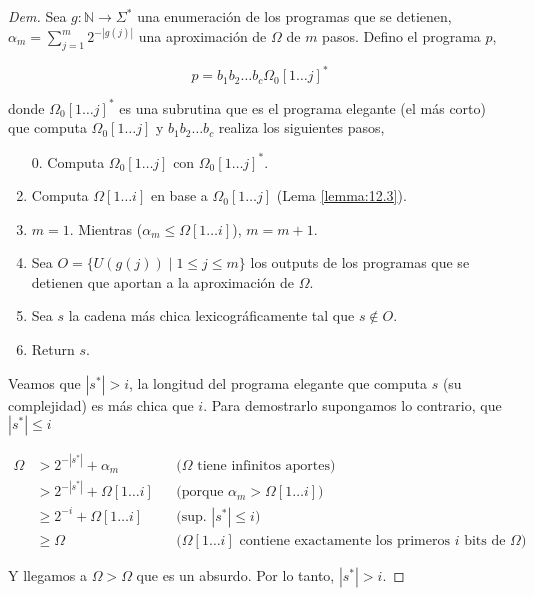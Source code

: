 \documentclass{article}
\theoremstyle{definition} %
\newcommand{\first}[2]{#2[1 \dots #1]}
\begin{document}
\begin{proof}[Dem]
    Sea $g: \mathbb{N} \to \Sigma^*$ una enumeración de los programas que se
    detienen, $\alpha_m = \sum_{j = 1}^{m} 2 ^ {-|g(j)|}$ una aproximación de
    $\Omega$ de $m$ pasos. Defino el programa $p$,

    \[
        p = b_1 b_2 \dots b_c \first{j}{\Omega_0}^*
    \]

    donde $\first{j}{\Omega_0}^*$ es una subrutina que es el programa elegante
    (el más corto) que computa $\first{j}{\Omega_0}$ y $b_1 b_2 \dots b_c$
    realiza los siguientes pasos,

    \begin{enumerate}
        \item[0.] Computa $\first{j}{\Omega_0}$ con
        $\first{j}{\Omega_0}^*$.
        \item Computa $\first{i}{\Omega}$ en base a
        $\first{j}{\Omega_0}$ (Lema \ref{lemma:12.3}).
        \item $m = 1$. Mientras ($\alpha_m \leq \first{i}{\Omega}$), $m = m + 1$.
        \item Sea $O = \{ U(g(j)) \mid 1 \leq j \leq m \}$ los outputs de los
        programas que se detienen que aportan a la aproximación de $\Omega$.
        \item Sea $s$ la cadena más chica lexicográficamente tal que $s \notin O$.
        \item Return $s$.
    \end{enumerate}

    Veamos que $|s^*| > i$, la longitud del programa elegante que computa $s$
    (su complejidad) es más chica que $i$. Para demostrarlo supongamos lo
    contrario, que $|s^*| \leq i$

    \begin{align*}
        \Omega 
        &> 2^{-|s^*|} + \alpha_m
            &&\text{($\Omega$ tiene infinitos aportes)}\\
        &> 2^{-|s^*|} + \first{i}{\Omega}
            &&\text{(porque $\alpha_m > \first{i}{\Omega}$)}\\
        &\geq 2^{-i} + \first{i}{\Omega}
            &&\text{(sup. $|s^*| \leq i$)}\\
        &\geq \Omega
            &&\text{($\first{i}{\Omega}$ contiene exactamente los primeros $i$ bits de $\Omega$)}
    \end{align*}

    Y llegamos a $\Omega > \Omega$ que es un absurdo. Por lo tanto, $|s^*| > i$.
    

\end{proof}
\end{document}
